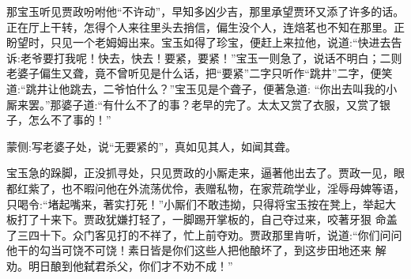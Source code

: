 \begin{parag}
    那宝玉听见贾政吩咐他“不许动”，早知多凶少吉，那里承望贾环又添了许多的话。正在厅上干转，怎得个人来往里头去捎信，偏生没个人，连焙茗也不知在那里。正盼望时，只见一个老姆姆出来。宝玉如得了珍宝，便赶上来拉他，说道:“快进去告诉:老爷要打我呢！快去，快去！要紧，要紧！”宝玉一则急了，说话不明白；二则老婆子偏生又聋，竟不曾听见是什么话，把“要紧”二字只听作“跳井”二字，便笑道:“跳井让他跳去，二爷怕什么？”宝玉见是个聋子，便著急道: “你出去叫我的小厮来罢。”那婆子道:“有什么不了的事？老早的完了。太太又赏了衣服，又赏了银子，怎么不了事的！”\begin{note}蒙侧:写老婆子处，说“无要紧的”，真如见其人，如闻其聋。\end{note}
\end{parag}


\begin{parag}
    宝玉急的跺脚，正没抓寻处，只见贾政的小厮走来，逼著他出去了。贾政一见，眼都红紫了，也不暇问他在外流荡优伶，表赠私物，在家荒疏学业，淫辱母婢等语，只喝令:“堵起嘴来，著实打死！”小厮们不敢违拗，只得将宝玉按在凳上，举起大板打了十来下。贾政犹嫌打轻了，一脚踢开掌板的，自己夺过来，咬著牙狠 命盖了三四十下。众门客见打的不祥了，忙上前夺劝。贾政那里肯听，说道:“你们问问他干的勾当可饶不可饶！素日皆是你们这些人把他酿坏了，到这步田地还来 解劝。明日酿到他弑君杀父，你们才不劝不成！”
\end{parag}


